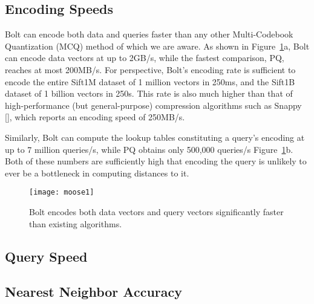 \subsection{Encoding Speeds}

Bolt can encode both data and queries faster than any other Multi-Codebook Quantization (MCQ) method of which we are aware. As shown in Figure~\ref{fig:encoding_speeds}a, Bolt can encode data vectors at up to 2GB/s, while the fastest comparison, PQ, reaches at most 200MB/s. For perspective, Bolt's encoding rate is sufficient to encode the entire Sift1M dataset of 1 million vectors in 250ms, and the Sift1B dataset of 1 billion vectors in 250s. This rate is also much higher than that of high-performance (but general-purpose) compression algorithms such as Snappy [], which reports an encoding speed of 250MB/s.

Similarly, Bolt can compute the lookup tables constituting a query's encoding at up to 7 million queries/s, while PQ obtains only 500,000 queries/s Figure~\ref{fig:encoding_speeds}b. Both of these numbers are sufficiently high that encoding the query is unlikely to ever be a bottleneck in computing distances to it.

\begin{figure}[h]
\begin{center}
\label{fig:encoding_speeds}
\texttt{[image: moose1]}
\vspace*{-1mm}
\caption{Bolt encodes both data vectors and query vectors significantly faster than existing algorithms.}
\end{center}
\end{figure}


\subsection{Query Speed}




\subsection{Nearest Neighbor Accuracy}



